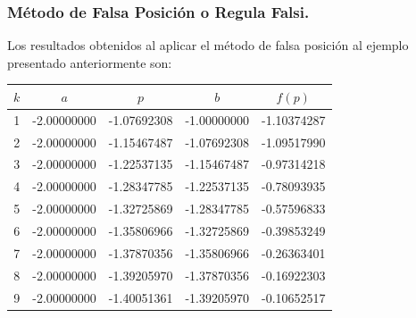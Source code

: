 \documentclass{beamer}
\begin{document}
\begin{frame}
  \frametitle{M\'etodo de Falsa Posici\'on o Regula Falsi.}
  Los resultados obtenidos al aplicar el m\'etodo de falsa posici\'on al ejemplo presentado anteriormente son:
  \scriptsize{
  \begin{center}
  \begin{table}[!ht]
    \begin{center}
    \begin{tabular}{|c||c||c||c||c|}\hline
  $k$  & $a$ & $p$ & $b$ & $f(p)$ \\\hline\hline
  1 & -2.00000000 & -1.07692308 & -1.00000000 & -1.10374287 \\\hline
2 & -2.00000000 & -1.15467487 & -1.07692308 & -1.09517990 \\\hline
3 & -2.00000000 & -1.22537135 & -1.15467487 & -0.97314218 \\\hline
4 & -2.00000000 & -1.28347785 & -1.22537135 & -0.78093935 \\\hline
5 & -2.00000000 & -1.32725869 & -1.28347785 & -0.57596833 \\\hline
6 & -2.00000000 & -1.35806966 & -1.32725869 & -0.39853249 \\\hline
7 & -2.00000000 & -1.37870356 & -1.35806966 & -0.26363401 \\\hline
8 & -2.00000000 & -1.39205970 & -1.37870356 & -0.16922303 \\\hline
9 & -2.00000000 & -1.40051361 & -1.39205970 & -0.10652517 \\\hline

\end{tabular}
\end{center}
\end{table}
\end{center}}
\end{frame}
\end{document}
